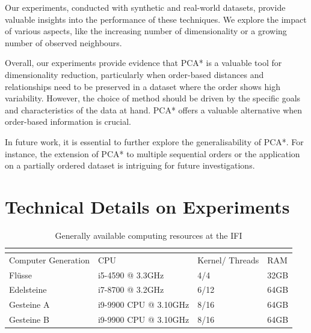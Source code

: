 \documentclass[pdftex,12pt,a4paper]{report}
\begin{document}
Our experiments, conducted with synthetic and real-world datasets, provide valuable insights into the performance of these techniques.
We explore the impact of various aspects, like the increasing number of dimensionality or a growing number of observed neighbours.

Overall, our experiments provide evidence that PCA* is a valuable tool for dimensionality reduction, particularly when order-based distances and relationships need to be preserved in a dataset where the order shows high variability.
However, the choice of method should be driven by the specific goals and characteristics of the data at hand.
PCA* offers a valuable alternative when order-based information is crucial.

In future work, it is essential to further explore the generalisability of PCA*.
For instance, the extension of PCA* to multiple sequential orders or the application on a partially ordered dataset is intriguing for future investigations. 

\appendix
\chapter{Technical Details on Experiments}
\begin{table}[htb!]
    \begin{tabular}{ |p{4cm}|p{5cm}|p{1.5cm}|p{1.5cm}|}
        \multicolumn{4}{c}{} \\
        \hline
        \hline
        Computer Generation & CPU & Kernel/ Threads & RAM \\
        \hline
        \hline
        Flüsse &  i5-4590 @ 3.3GHz & 4/4 & 32GB \\
        Edelsteine & i7-8700 @ 3.2GHz & 6/12 & 64GB \\
        Gesteine A & i9-9900 CPU @ 3.10GHz & 8/16 & 64GB \\
        Gesteine B  & i9-9900 CPU @ 3.10GHz &8/16 & 64GB \\
        \hline
    \end{tabular}
    \caption{Generally available computing resources at the IFI \cite{cip-computers}}
\end{table}



 

\end{document}
